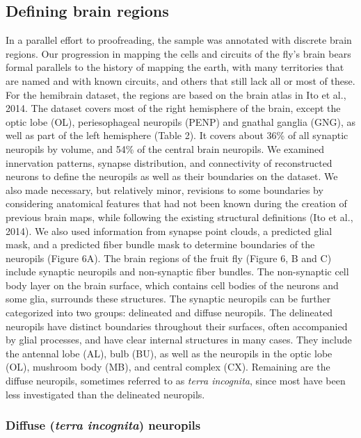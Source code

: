 \documentclass{article}
\begin{document}

\subsection*{Defining brain regions}

In a parallel effort to proofreading, the sample was annotated with discrete brain regions. Our progression in mapping the cells and circuits of the fly’s brain bears formal parallels to the history of mapping the earth, with many territories that are named and with known circuits, and others that still lack all or most of these. For the hemibrain dataset, the regions are based on the brain atlas in Ito et al., 2014. The dataset covers most of the right hemisphere of the brain, except the optic lobe (OL), periesophageal neuropils (PENP) and gnathal ganglia (GNG), as well as part of the left hemisphere (Table 2). It covers about 36\% of all synaptic neuropils by volume, and 54\% of the central brain neuropils. We examined innervation patterns, synapse distribution, and connectivity of reconstructed neurons to define the neuropils as well as their boundaries on the dataset. We also made necessary, but relatively minor, revisions to some boundaries by considering anatomical features that had not been known during the creation of previous brain maps, while following the existing structural definitions (Ito et al., 2014). We also used information from synapse point clouds, a predicted glial mask, and a predicted fiber bundle mask to determine boundaries of the neuropils (Figure 6A). The brain regions of the fruit fly (Figure 6, B and C) include synaptic neuropils and non-synaptic fiber bundles. The non-synaptic cell body layer on the brain surface, which contains cell bodies of the neurons and some glia, surrounds these structures. The synaptic neuropils can be further categorized into two groups: delineated and diffuse neuropils. The delineated neuropils have distinct boundaries throughout their surfaces, often accompanied by glial processes, and have clear internal structures in many cases. They include the antennal lobe (AL), bulb (BU), as well as the neuropils in the optic lobe (OL), mushroom body (MB), and central complex (CX). Remaining are the diffuse neuropils, sometimes referred to as \emph{terra incognita}, since most have been less investigated than the delineated neuropils.

\subsubsection*{Diffuse (\emph{terra incognita}) neuropils}
\end{document}
